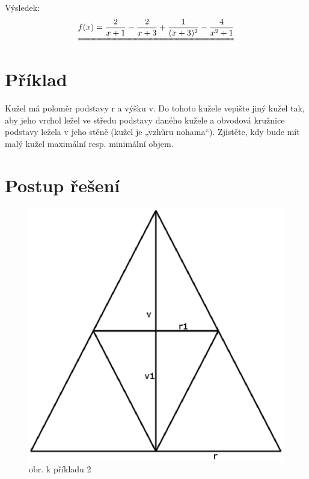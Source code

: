 \documentclass[a4paper, 11pt]{article}
\begin{document}
	\bigskip
	
	Výsledek:
	\begin{equation}
	\uuline{f(x) = \frac{2}{x+1}-\frac{2}{x+3}+\frac{1}{(x+3)^2}-\frac{4}{x^2+1}}
	\end{equation}
	
 \section{Příklad}

Kužel má poloměr podstavy r a výšku v. Do tohoto kužele vepište jiný kužel tak, aby jeho vrchol ležel
 ve středu podstavy daného kužele a obvodová kružnice podstavy ležela v jeho stěně (kužel je „vzhůru
 nohama“). Zjistěte, kdy bude mít malý kužel maximální resp. minimální objem.

\section*{Postup řešení}
\begin{figure}[h!]
	\centering
	\includegraphics[width=0.55\linewidth]{image.eps}
	\caption{obr. k příkladu 2}
	\label{fig:image.eps}
\end{figure}
\end{document}
